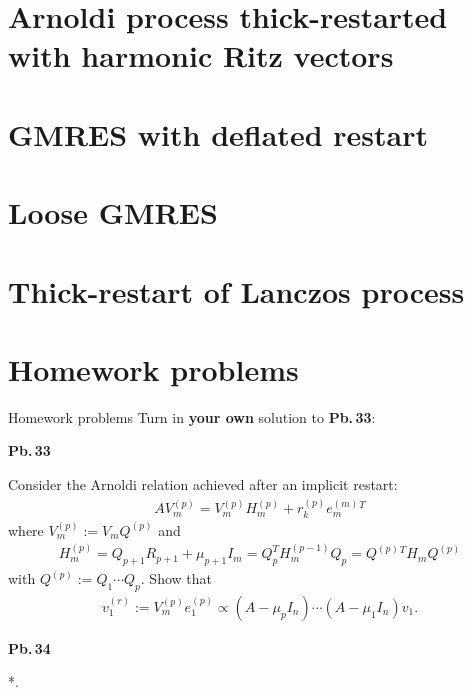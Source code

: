 \documentclass[t,usepdftitle=false]{beamer}
\begin{document}
\section{Arnoldi process thick-restarted with harmonic Ritz vectors}

\section{GMRES with deflated restart}

\section{Loose GMRES}

\section{Thick-restart of Lanczos process}

\section{Homework problems}
\begin{frame}{Homework problems}\vspace{.1cm}
Turn in \textbf{your own} solution to \textbf{Pb.$\,$33}:\vspace{.15cm}\\
\begin{minipage}[t]{0.1\textwidth}
\textbf{Pb.$\,$33}
\end{minipage}
\begin{minipage}[t]{0.89\textwidth}
Consider the Arnoldi relation achieved after an implicit restart:
\begin{align*}
AV_m^{(p)}=V_m^{(p)}H_m^{(p)}+r_k^{(p)}e_m^{(m)}{}^T
\end{align*}
where $V_m^{(p)}:=V_mQ^{(p)}$ and
\begin{align*}
H_m^{(p)}
=Q_{p+1}R_{p+1}+\mu_{p+1}I_m
=Q_p^TH_m^{(p-1)}Q_p
=Q^{(p)}{}^TH_mQ^{(p)}
\end{align*}
with $Q^{(p)}:=Q_1\cdots Q_p$.
Show that 
\begin{align*}
v_1^{(r)}:=
V_m^{(p)}e_1^{(p)}
\propto
(A-\mu_pI_n)\cdots(A-\mu_1I_n)v_1.
\end{align*}
\end{minipage}
\vspace{.15cm}
\begin{minipage}[t]{0.1\textwidth}
\textbf{Pb.$\,$34}
\end{minipage}
\begin{minipage}[t]{0.89\textwidth}
*.
\end{minipage}


\end{frame}

























	
\end{document}
